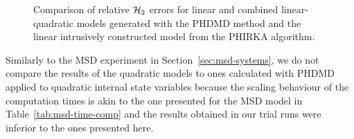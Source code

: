 \begin{figure}[ht]
    \centering
    \caption{Comparison of relative $\mathcal{H}_2$ errors for linear and combined linear-quadratic models generated with the \ac{PHDMD} method and the linear intrusively constructed model from the \ac{PHIRKA} algorithm.}\label{fig:wave-methods-comp}
\end{figure}

Similarly to the \ac{MSD} experiment in Section~\ref{sec:msd-systems}, we do not compare the results of the quadratic models to ones calculated with \ac{PHDMD} applied to quadratic internal state variables because the scaling behaviour of the computation times is akin to the one presented for the \ac{MSD} model in Table~\ref{tab:msd-time-comp} and the results obtained in our trial runs were inferior to the ones presented here.

